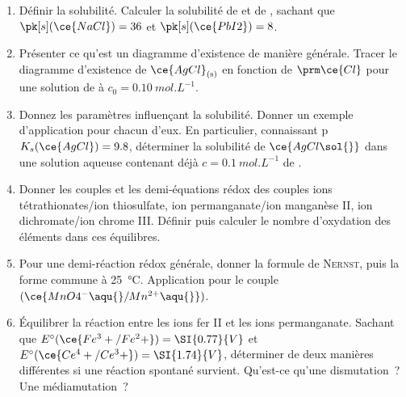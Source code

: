 \documentclass[a4paper, 12pt, final, garamond]{book}
\begin{document}
\begin{enumerate}[label=\sqenumi]
	\item Définir la solubilité. Calculer la solubilité de  et de
	      , sachant que $\pk[s](\ce{NaCl}) = 36$ et $\pk[s](\ce{PbI2}) =
		      8$.

	\item Présenter ce qu'est un diagramme d'existence de manière générale.
	      Tracer le diagramme d'existence de $\ce{AgCl}_{\rm(s)}$ en fonction de
	      $\prm \ce{Cl}$ pour une solution de  à $c_0 =
		      \SI{0.10}{mol.L^{-1}}$.

	\item Donnez les paramètres influençant la solubilité. Donner un exemple
	      d'application pour chacun d'eux. En particulier, connaissant
	      p$K_s(\ce{AgCl}) = 9.8$, déterminer la solubilité de $\ce{AgCl\sol{}}$
	      dans une solution aqueuse contenant déjà $c = \SI{0.1}{mol.L^{-1}}$ de
	      .

	\item Donner les couples et les demi-équations rédox des couples ions
	      tétrathionates/ion thiosulfate, ion permanganate/ion manganèse II, ion
	      dichromate/ion chrome III.
	      Définir puis
	      calculer le nombre d'oxydation des éléments dans ces équilibres.
	\item Pour une demi-réaction rédox générale, donner la formule de
	      \textsc{Nernst}, puis la forme commune à \SI{25}{\degreeCelsius}.
	      Application pour le couple $(\ce{MnO4^{-}\aqu{}/Mn^{2+}\aqu{}})$.
	\item Équilibrer la réaction entre les ions fer II et les ions permanganate.
	      Sachant que $E^\circ(\ce{Fe^3+/Fe^2+}) = \SI{0.77}{V}$ et
	      $E^\circ(\ce{Ce^4+/Ce^3+}) = \SI{1.74}{V}$, déterminer de deux manières
	      différentes si une réaction spontané survient. Qu'est-ce qu'une
	      dismutation~? Une médiamutation~?
\end{enumerate}
\end{document}
